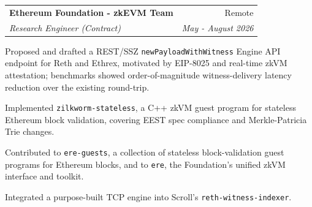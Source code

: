 \documentclass[11pt,a4paper]{article}
\makeatletter
\newcommand{\cventry}[4]{%
  \begin{tabular*}{\linewidth}[t]{@{\extracolsep{\fill}}l r@{}}
    \textbf{#1} & #2 \\
    \textit{#3} & \textit{#4}
  \end{tabular*}%
}
\makeatother
\begin{document}
\begin{cventries}


\item \cventry{Ethereum Foundation - zkEVM Team}{Remote}
              {Research Engineer (Contract)}{May - August 2026}
\begin{cvbullets}
  \item Proposed and drafted a REST/SSZ \texttt{newPayloadWithWitness} Engine API endpoint for Reth and
        Ethrex, motivated by EIP-8025 and real-time zkVM attestation; benchmarks showed order-of-magnitude
        witness-delivery latency reduction over the existing round-trip.
  \item Implemented \texttt{zilkworm-stateless}, a C++ zkVM guest program for stateless Ethereum block
        validation, covering EEST spec compliance and Merkle-Patricia Trie changes.
  \item Contributed to \texttt{ere-guests}, a collection of stateless block-validation guest programs for
        Ethereum blocks, and to \texttt{ere}, the Foundation's unified zkVM interface and toolkit.
  \item Integrated a purpose-built TCP engine into Scroll's \texttt{reth-witness-indexer}.
\end{cvbullets}


\end{cventries}
\end{document}
